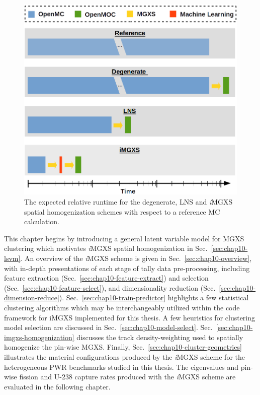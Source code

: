 \begin{figure}[h!]
\centering
\includegraphics[width=0.6\linewidth]{figures/unsupervised/flow-chart}
\vspace{2mm}
\caption[Expected relative runtime for different homogenization schemes]{The expected relative runtime for the degenerate, \ac{LNS} and \textit{i}\ac{MGXS} spatial homogenization schemes with respect to a reference \ac{MC} calculation.}
\label{fig:chap10-flow-chart}
\end{figure}

This chapter begins by introducing a general latent variable model for \ac{MGXS} clustering which motivates \textit{i}\ac{MGXS} spatial homogenization in Sec.~\ref{sec:chap10-lsvm}. An overview of the \textit{i}\ac{MGXS} scheme is given in Sec.~\ref{sec:chap10-overview}, with in-depth presentations of each stage of tally data pre-processing, including feature extraction (Sec.~\ref{sec:chap10-feature-extract}) and selection (Sec.~\ref{sec:chap10-feature-select}), and dimensionality reduction (Sec.~\ref{sec:chap10-dimension-reduce}). Sec.~\ref{sec:chap10-train-predictor} highlights a few statistical clustering algorithms which may be interchangeably utilized within the code framework for i\ac{MGXS} implemented for this thesis. A few heuristics for clustering model selection are discussed in Sec.~\ref{sec:chap10-model-select}. Sec.~\ref{sec:chap10-imgxs-homogenization} discusses the track density-weighting used to spatially homogenize the pin-wise \ac{MGXS}. Finally, Sec.~\ref{sec:chap10-cluster-geometries} illustrates the material configurations produced by the \textit{i}\ac{MGXS} scheme for the heterogeneous \ac{PWR} benchmarks studied in this thesis. The eigenvalues and pin-wise fission and U-238 capture rates produced with the \textit{i}\ac{MGXS} scheme are evaluated in the following chapter.




